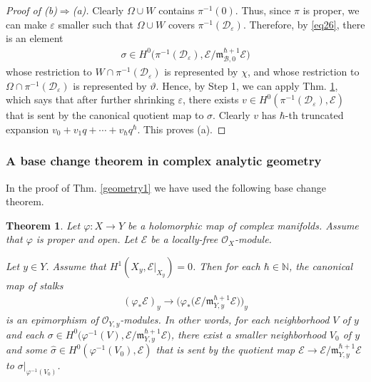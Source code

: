 \documentclass[11pt,b5paper,notitlepage]{article}
\theoremstyle{definition}
\theoremstyle{plain}
\newtheorem{thm}[df]{Theorem}
\newcommand{\wht}{\widehat}
\newcommand{\scr}{\mathscr}
\newcommand{\Nbb}{\mathbb N}
\newcommand{\<}{\left\langle}
\renewcommand{\>}{\right\rangle}
\newcommand{\MO}{\mathcal{O}}
\newcommand{\MB}{\mathcal{B}}
\newcommand{\MD}{\mathcal{D}}
\newcommand{\mk}{\mathfrak m}
\newcommand{\eps}{\varepsilon}
\numberwithin{equation}{section}
\begin{document}
\begin{proof}[Proof of (b)$\Rightarrow$(a)]
Clearly $\Omega\cup W$ contains $\pi^{-1}(0)$. Thus, since $\pi$ is proper, we can make $\eps$ smaller such that $\Omega\cup W$ covers $\pi^{-1}(\MD_\eps)$. Therefore, by \eqref{eq26}, there is an element
\begin{align*}
\sigma\in H^0\big(\pi^{-1}(\MD_\eps),\scr E/\mk_{\MB,0}^{\hbar+1}\scr E\big)
\end{align*}
whose restriction to $W\cap \pi^{-1}(\MD_\eps)$ is represented by $\chi$, and whose restriction to $\Omega\cap\pi^{-1}(\MD_\eps)$ is represented by $\vartheta$. Hence, by Step 1, we can apply Thm. \ref{lb6}, which says that after further shrinking $\eps$, there exists $v\in H^0(\pi^{-1}(\MD_\eps),\scr E)$ that is sent by the canonical quotient map to $\sigma$. Clearly $v$ has $\hbar$-th truncated expansion $v_0+v_1q+\cdots+v_\hbar q^\hbar$. This proves (a).
\end{proof}



\subsubsection{A base change theorem in complex analytic geometry}


In the proof of Thm. \ref{geometry1} we have used the following base change theorem.

\begin{thm}\label{lb6}
Let $\varphi:X\rightarrow Y$ be a holomorphic map of complex manifolds. Assume that $\varphi$ is proper and open. Let $\scr E$ be a locally-free $\MO_X$-module. 

Let $y\in Y$. Assume that $H^1(X_y,\scr E|_{X_y})=0$. Then for each $\hbar\in\Nbb$, the canonical map of stalks
\begin{align}
(\varphi_*\scr E)_y\longrightarrow \big(\varphi_*\big(\scr E/\mk_{Y,y}^{\hbar+1}\scr E\big)\big)_y
\end{align}
is an epimorphism of $\MO_{Y,y}$-modules. In other words, for each neighborhood $V$ of $y$ and each $\sigma\in H^0\big(\varphi^{-1}(V),\scr E/\mk_{Y,y}^{\hbar+1}\scr E\big)$, there exist a smaller neighborhood $V_0$ of $y$ and some $\wht\sigma\in H^0(\varphi^{-1}(V_0),\scr E)$ that is sent by the quotient map $\scr E\rightarrow\scr E/\mk_{Y,y}^{\hbar+1}\scr E$ to $\sigma|_{\varphi^{-1}(V_0)}$.
\end{thm}
\end{document}
